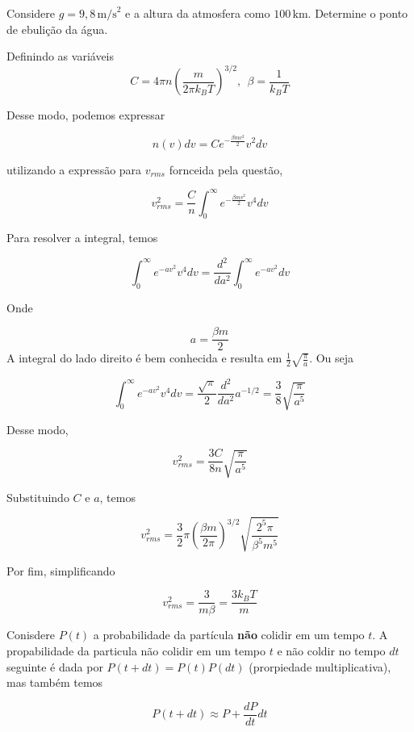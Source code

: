 \documentclass[11pt]{article}
\begin{document}
\begin{pproblem}
\begin{alternativas}
\item Considere $g = 9,8 \, \text{m/s}^2$ e a altura da atmosfera como $100 \, \text{km}$. Determine o ponto de ebulição da água. 

\end{alternativas}

\begin{pssolution*}{}{}
    \begin{alternativas}
    \item Definindo as variáveis 
    \[C = 4\pi n \left(\frac{m}{2\pi k_B T}\right)^{3/2}, \ \ \beta = \frac{1}{k_BT}\]

    Desse modo, podemos expressar 

    \[n(v)dv = C e^{-\frac{\beta mv^2}{2}}v^2dv\]

    utilizando a expressão para \(v_{rms}\) fornceida pela questão, 

    \[v_{rms}^2 = \frac{C}{n}\int_0^\infty  e^{-\frac{\beta mv^2}{2}}v^4 dv\]

    Para resolver a integral, temos 

    \[\int_0^{\infty} e^{-av^2}v^4 dv = \frac{d^2}{da^2}\int_0^{\infty} e^{-av^2}dv\] 

    Onde 

    \[a = \frac{\beta m}{2}\]
    A integral do lado direito é bem conhecida e resulta em \(\frac{1}{2}\sqrt{\frac{\pi}{a}}\). Ou seja

    \[\int_0^{\infty} e^{-av^2}v^4 dv = \frac{\sqrt{\pi}}{2}\frac{d^2}{da^2}a^{-1/2} = \frac{3}{8}\sqrt{\frac{\pi}{a^5}}\]

    Desse modo, 

    \[v_{rms}^2 = \frac{3C}{8n}\sqrt{\frac{\pi}{a^5}}\]

    Substituindo \(C\) e \(a\), temos 

    \[v_{rms}^2 = \frac{3}{2}\pi  \left(\frac{\beta m}{2\pi}\right)^{3/2}\sqrt{\frac{2^5\pi}{\beta^5m^5}}\]
    
    Por fim, simplificando 

    \[\boxed{v_{rms}^2 = \frac{3}{m\beta} = \frac{3k_B T}{m}}\]

    \item Conisdere \(P(t)\) a probabilidade da partícula \textbf{não} colidir em um tempo \(t\). A propabilidade da particula não colidir em um tempo \(t\) e não coldir no tempo \(dt\) seguinte é dada por \(P(t+dt) = P(t)P(dt)\) (prorpiedade multiplicativa), mas também temos
    
    \[P(t+dt) \approx P + \frac{dP}{dt}dt\]


\end{alternativas}
\end{pssolution*}
\end{pproblem}
\end{document}
